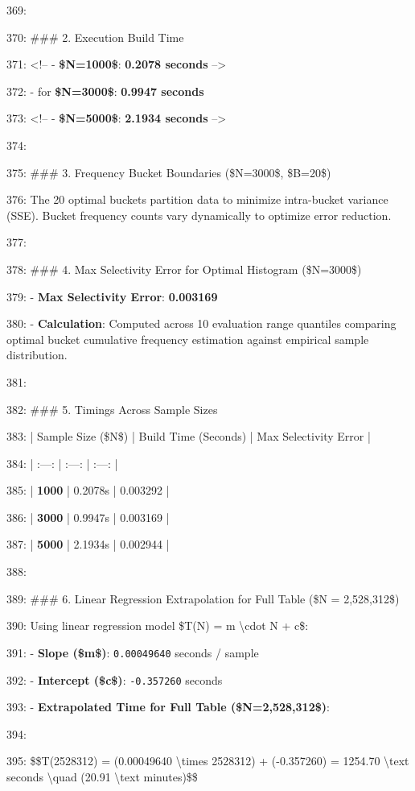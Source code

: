 \documentclass[11pt,a4paper]{article}
\begin{document}
{369:

370: \#\#\# 2. Execution Build Time

371: <!-- - \textbf{\$N=1000\$}: \textbf{0.2078 seconds} -->

372: - for \textbf{\$N=3000\$}: \textbf{0.9947 seconds}

373: <!-- - \textbf{\$N=5000\$}: \textbf{2.1934 seconds} -->

374:

375: \#\#\# 3. Frequency Bucket Boundaries (\$N=3000\$, \$B=20\$)

376: The 20 optimal buckets partition data to minimize intra-bucket variance (SSE). Bucket frequency counts vary dynamically to optimize error reduction.

377:

378: \#\#\# 4. Max Selectivity Error for Optimal Histogram (\$N=3000\$)

379: - \textbf{Max Selectivity Error}: \textbf{0.003169}

380: - \textbf{Calculation}: Computed across 10 evaluation range quantiles comparing optimal bucket cumulative frequency estimation against empirical sample distribution.

381:

382: \#\#\# 5. Timings Across Sample Sizes

383: | Sample Size (\$N\$) | Build Time (Seconds) | Max Selectivity Error |

384: | :---: | :---: | :---: |

385: | \textbf{1000} | 0.2078s | 0.003292 |

386: | \textbf{3000} | 0.9947s | 0.003169 |

387: | \textbf{5000} | 2.1934s | 0.002944 |

388:

389: \#\#\# 6. Linear Regression Extrapolation for Full Table (\$N = 2,528,312\$)

390: Using linear regression model \$T(N) = m \textbackslash{}cdot N + c\$:

391: - \textbf{Slope (\$m\$)}: \texttt{0.00049640} seconds / sample

392: - \textbf{Intercept (\$c\$)}: \texttt{-0.357260} seconds

393: - \textbf{Extrapolated Time for Full Table (\$N=2,528,312\$)}:

394:

395: \$\$T(2528312) = (0.00049640 \textbackslash{}times 2528312) + (-0.357260) = 1254.70 \textbackslash{}text{ seconds} \textbackslash{}quad (20.91 \textbackslash{}text{ minutes})\$\$

}
\end{document}
